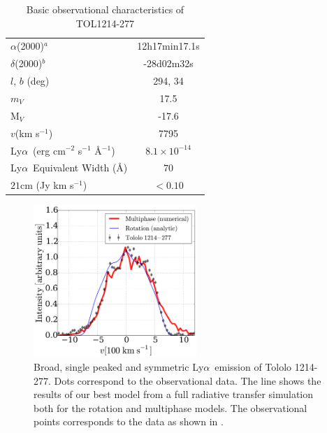 \documentclass[a4,useAMS,usenatbib,usegraphicx]{mn2e}
\newcommand{\tol}{Tololo 1214-277}
\newcommand{\lya}{Ly$\alpha$}
\begin{document}
\begin{table}
\begin{center}
\begin{tabular}{lc}\hline
$\alpha$(2000)$^{a}$ & 12h17min17.1s\\
$\delta$(2000)$^{b}$ & -28d02m32s\\
$l$, $b$ (deg) & 294, 34\\
$m_V$ & 17.5\\
  M$_V$ & -17.6\\ 
$v$(km s$^{-1}$) & 7795\\
\lya\ (erg cm$^{-2}$ s$^{-1}$ \AA$^{-1}$)& $8.1\times 10^{-14}$ \\
\lya\ Equivalent Width (\AA) & $70$\\
$21$cm (Jy km s$^{-1}$)& $<0.10$ \\\hline
\end{tabular}
\end{center}
\caption{Basic observational characteristics of TOL1214-277
  \citep{Thuan97}\label{obstable}} 
\end{table}



\begin{figure}
\begin{center}
\includegraphics[width=0.55\textwidth]{CLARA-TOL-main.pdf}
\caption{Broad, single peaked and symmetric \lya\ emission of \tol.
  Dots correspond to the observational data. The line shows the results
of our best model from a full radiative transfer simulation both for
the rotation and multiphase models.
The observational points corresponds to the data as shown in
\citep{mashesse03}.}   
\end{center}
\end{figure}
\end{document}
